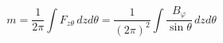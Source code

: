\begin{equation}
 m=\frac{1}{2\pi}\int F_{z\theta}\,dzd\theta =\frac{1}{(2\pi )^2}
\int\frac{B_{\varphi}}{\sin\theta}\,dzd\theta
\label{u3}
\end{equation}

